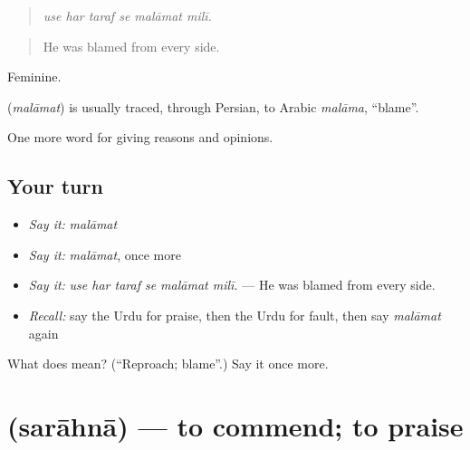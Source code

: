 \begin{quote}
     
\end{quote}

\begin{quote}
\emph{use har taraf se malāmat milī.}
\end{quote}

\begin{quote}
He was blamed from every side.
\end{quote}

Feminine.

\begin{cousinweb}
\textbf{} (\emph{malāmat}) is usually traced, through Persian, to Arabic \emph{malāma}, \textquotedblleft{}blame\textquotedblright{}.
\end{cousinweb}

\begin{grammarlens}[title={What you've built}]
One more word for giving reasons and opinions.
\end{grammarlens}

\subsection*{Your turn}
\begin{itemize}
\raggedright
  \item \emph{Say it:} \emph{malāmat}
  \item \emph{Say it:} \emph{malāmat}, once more
  \item \emph{Say it:} \emph{use har taraf se malāmat milī.} — He was blamed from every side.
  \item \emph{Recall:} say the Urdu for praise, then the Urdu for fault, then say \emph{malāmat} again
\end{itemize}

\begin{tcolorbox}[breakable,colback=teal!4,colframe=teal!35!black,title={Before you move on}]
What does  mean? (\textquotedblleft{}Reproach; blame\textquotedblright{}.) Say it once more.
\end{tcolorbox}
\section[\texorpdfstring{\ur{سراہنا} (sarāhnā)}{سراہنا (sarāhnā)}]{ (sarāhnā) — to commend; to praise}

\label{lesson:UR-C355-sarahna}



